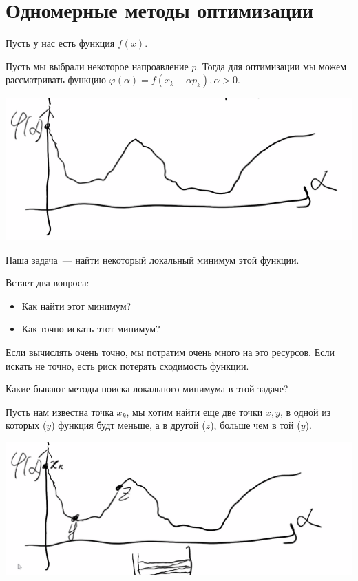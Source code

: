 \section{Одномерные методы оптимизации}

Пусть у нас есть функция $f(x)$.

Пусть мы выбрали некоторое напроавление $p$.
Тогда для оптимизации мы можем рассматривать функцию
$\varphi(\alpha) = f(x_k+ \alpha p_k), \alpha > 0$.

\begin{center}
    \includegraphics[scale=0.5]{img/methopt_one_dimensional_optimization_f_proect}
\end{center}

Наша задача~--- найти некоторый локальный минимум этой функции.

Встает два вопроса:
\begin{itemize}
    \item Как найти этот минимум?
    \item Как точно искать этот минимум?
\end{itemize}

Если вычислять очень точно, мы потратим очень много на это ресурсов.
Если искать не точно, есть риск потерять сходимость функции.

Какие бывают методы поиска локального минимума в этой задаче?

Пусть нам известна точка $x_k$, мы хотим найти еще две точки $x, y$, в одной из которых ($y$) функция будт меньше, а в другой ($z$), больше чем в той ($y$).

\begin{center}
    \includegraphics[scale=0.5]{img/methopt_one_dimensional_optimization_f_proect_points}
\end{center}

